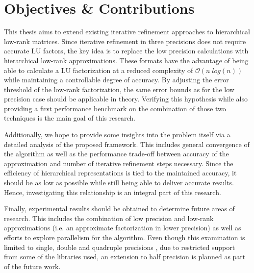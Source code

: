 \section{Objectives \& Contributions}
\label{sec:objectives}

This thesis aims to extend existing iterative refinement approaches to hierarchical low-rank matrices. Since iterative refinement in three precisions does not require accurate LU factors, the key idea is to replace the low precision calculations with hierarchical low-rank approximations. These formats have the advantage of being able to calculate a LU factorization at a reduced complexity of $\mathcal{O}(n\;log(n))$ while maintaining a controllable degree of accuracy. By adjusting the error threshold of the low-rank factorization, the same error bounds as for the low precision case should be applicable in theory. Verifying this hypothesis while also providing a first performance benchmark on the combination of those two techniques is the main goal of this research.

Additionally,  we hope to provide some insights into the problem itself via a detailed analysis of the  proposed framework. This includes general convergence of the algorithm as well as the performance trade-off between accuracy of the approximation and number of iterative refinement steps necessary. Since the efficiency of hierarchical representations is tied to the maintained accuracy, it should be as low as possible while still being able to deliver accurate results. Hence, investigating this relationship is an integral part of this research. 

Finally, experimental results should be obtained to determine future areas of research. This includes the combination of low precision and low-rank approximations (i.e. an approximate factorization in lower precision) as well as efforts to explore parallelism for the algorithm. Even though this examination is limited to single, double and quadruple precisions \cite{institute_of_electrical_and_electronics_engineers_ieee_2008}, due to restricted support from some of the libraries used, an extension to half precision is planned as part of the future work.

